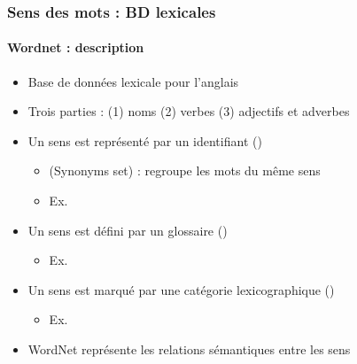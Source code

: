 \documentclass[xcolor=table]{beamer}
\begin{document}
\begin{frame}
\frametitle{Sens des mots : BD lexicales}
\framesubtitle{Wordnet : description}
	
\begin{itemize}
	\item Base de données lexicale pour l'anglais \cite{1995-miller}
	\item Trois parties : (1) noms (2) verbes (3) adjectifs et adverbes
	\item Un sens est représenté par un identifiant ()
	\begin{itemize}
		\item {} (Synonyms set) : regroupe les mots du même sens 
		\item Ex. 
	\end{itemize}
	\item Un sens est défini par un glossaire ()
	\begin{itemize}
		\item Ex. 
	\end{itemize}
	\item Un sens est marqué par une catégorie lexicographique ()
	\begin{itemize}
		\item Ex. 
	\end{itemize}
	\item WordNet représente les relations sémantiques entre les sens
\end{itemize}
	
\end{frame}
\end{document}
